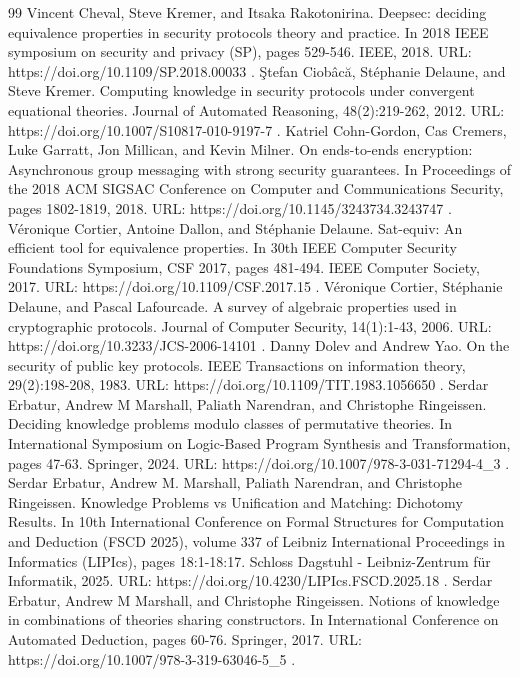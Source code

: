 \begin{thebibliography}{99}
 Vincent Cheval, Steve Kremer, and Itsaka Rakotonirina. Deepsec: deciding equivalence properties in security protocols theory and practice. In 2018 IEEE symposium on security and privacy (SP), pages 529-546. IEEE, 2018. URL: https://doi.org/10.1109/SP.2018.00033 .
 Ştefan Ciobâcă, Stéphanie Delaune, and Steve Kremer. Computing knowledge in security protocols under convergent equational theories. Journal of Automated Reasoning, 48(2):219-262, 2012. URL: https://doi.org/10.1007/S10817-010-9197-7 .
 Katriel Cohn-Gordon, Cas Cremers, Luke Garratt, Jon Millican, and Kevin Milner. On ends-to-ends encryption: Asynchronous group messaging with strong security guarantees. In Proceedings of the 2018 ACM SIGSAC Conference on Computer and Communications Security, pages 1802-1819, 2018. URL: https://doi.org/10.1145/3243734.3243747 .
 Véronique Cortier, Antoine Dallon, and Stéphanie Delaune. Sat-equiv: An efficient tool for equivalence properties. In 30th IEEE Computer Security Foundations Symposium, CSF 2017, pages 481-494. IEEE Computer Society, 2017. URL: https://doi.org/10.1109/CSF.2017.15 .
 Véronique Cortier, Stéphanie Delaune, and Pascal Lafourcade. A survey of algebraic properties used in cryptographic protocols. Journal of Computer Security, 14(1):1-43, 2006. URL: https://doi.org/10.3233/JCS-2006-14101 .
 Danny Dolev and Andrew Yao. On the security of public key protocols. IEEE Transactions on information theory, 29(2):198-208, 1983. URL: https://doi.org/10.1109/TIT.1983.1056650 .
 Serdar Erbatur, Andrew M Marshall, Paliath Narendran, and Christophe Ringeissen. Deciding knowledge problems modulo classes of permutative theories. In International Symposium on Logic-Based Program Synthesis and Transformation, pages 47-63. Springer, 2024. URL: https://doi.org/10.1007/978-3-031-71294-4\_3 .
 Serdar Erbatur, Andrew M. Marshall, Paliath Narendran, and Christophe Ringeissen. Knowledge Problems vs Unification and Matching: Dichotomy Results. In 10th International Conference on Formal Structures for Computation and Deduction (FSCD 2025), volume 337 of Leibniz International Proceedings in Informatics (LIPIcs), pages 18:1-18:17. Schloss Dagstuhl - Leibniz-Zentrum für Informatik, 2025. URL: https://doi.org/10.4230/LIPIcs.FSCD.2025.18 .
 Serdar Erbatur, Andrew M Marshall, and Christophe Ringeissen. Notions of knowledge in combinations of theories sharing constructors. In International Conference on Automated Deduction, pages 60-76. Springer, 2017. URL: https://doi.org/10.1007/978-3-319-63046-5\_5 .

\end{thebibliography}
